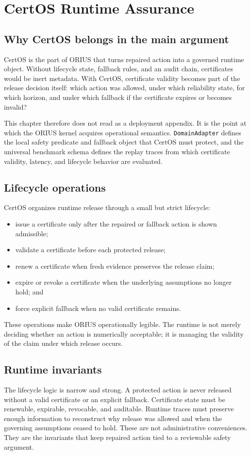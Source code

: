 \chapter{CertOS Runtime Assurance}
\label{ch:certos-runtime-assurance}

\section{Why CertOS belongs in the main argument}
CertOS is the part of ORIUS that turns repaired action into a governed runtime object.
Without lifecycle state, fallback rules, and an audit chain, certificates would be inert
metadata. With CertOS, certificate validity becomes part of the release decision itself:
which action was allowed, under which reliability state, for which horizon, and under which
fallback if the certificate expires or becomes invalid?

This chapter therefore does not read as a deployment appendix. It is the point at which the
ORIUS kernel acquires operational semantics. \texttt{DomainAdapter} defines the local safety
predicate and fallback object that CertOS must protect, and the universal benchmark schema
defines the replay traces from which certificate validity, latency, and lifecycle behavior
are evaluated.

\section{Lifecycle operations}
CertOS organizes runtime release through a small but strict lifecycle:
\begin{itemize}
  \item issue a certificate only after the repaired or fallback action is shown admissible;
  \item validate a certificate before each protected release;
  \item renew a certificate when fresh evidence preserves the release claim;
  \item expire or revoke a certificate when the underlying assumptions no longer hold; and
  \item force explicit fallback when no valid certificate remains.
\end{itemize}
These operations make ORIUS operationally legible. The runtime is not merely deciding
whether an action is numerically acceptable; it is managing the validity of the claim under
which release occurs.

\section{Runtime invariants}
The lifecycle logic is narrow and strong. A protected action is never released without a
valid certificate or an explicit fallback. Certificate state must be renewable, expirable,
revocable, and auditable. Runtime traces must preserve enough information to reconstruct why
release was allowed and when the governing assumptions ceased to hold. These are not
administrative conveniences. They are the invariants that keep repaired action tied to a
reviewable safety argument.

